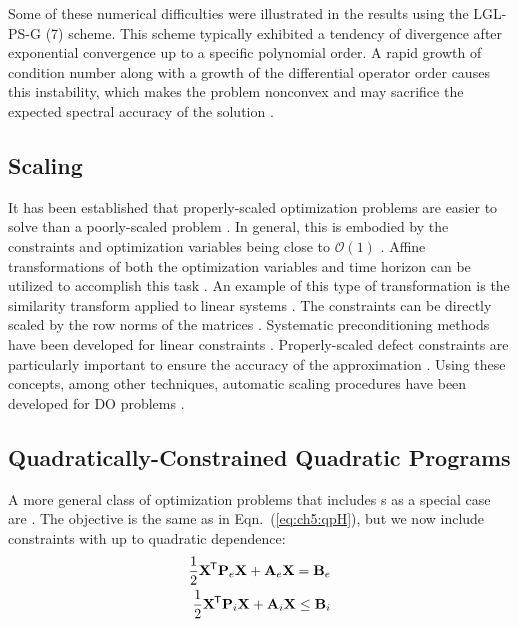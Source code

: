 Some of these numerical difficulties were illustrated in the results using the LGL-PS-G (7) scheme.
This scheme typically exhibited a tendency of divergence after exponential convergence up to a specific polynomial order.
A rapid growth of condition number along with a growth of the differential operator order causes this instability, which makes the problem nonconvex and may sacrifice the expected spectral accuracy of the solution \cite{Wang2014a, Trefethen1987a}.

\subsection{Scaling}

It has been established that properly-scaled optimization problems are easier to solve than a poorly-scaled problem \cite{Rao2010a}.
In general, this is embodied by the constraints and optimization variables being close to $\mathcal{O}(1)$ \cite{Gill1981a}.
Affine transformations of both the optimization variables and time horizon can be utilized to accomplish this task \cite{Herber2017c, Rao2010a}.
An example of this type of transformation is the similarity transform applied to linear systems \cite{Chen1999a}.
The constraints can be directly scaled by the row norms of the matrices \cite{Rao2010a}. 
Systematic preconditioning methods have been developed for linear constraints \cite{Bergamaschi2004a, Benzi2002a}.
Properly-scaled defect constraints are particularly important to ensure the accuracy of the approximation \cite{Herber2017c}.
Using these concepts, among other techniques, automatic scaling procedures have been developed for DO problems \cite{Rao2010a}.

\subsection{Quadratically-Constrained Quadratic Programs} \label{sec:ch5:QCQP}

A more general class of optimization problems that includes {\qp}s as a special case are  \cite{Boyd2009a}.
The objective is the same as in Eqn.~(\ref{eq:ch5:qpH}), but we now include constraints with up to quadratic dependence:%
\begin{subequations} \label{eq:ch5:QCQP}
\begin{align}
\frac{1}{2}\mathbf{X}^{\mkern-1.5mu\mathsf{T}}\mathbf{P}_{e}\mathbf{X}  + \mathbf{A}_{e}\mathbf{X} = \mathbf{B}_{e} \\
\frac{1}{2}\mathbf{X}^{\mkern-1.5mu\mathsf{T}}\mathbf{P}_{i}\mathbf{X}  + \mathbf{A}_{i}\mathbf{X} \leq \mathbf{B}_{i}
\end{align}
\end{subequations}%

